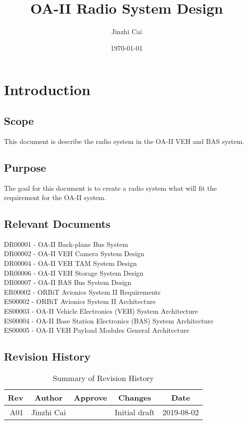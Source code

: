 \documentclass[12pt,article]{memoir}
\title{OA-II Radio System Design}
\author{Jinzhi Cai}
\date{\today}
\begin{document}
	


\tableofcontents*
\clearpage


\chapter{Introduction}
\section{Scope}
This document is describe the radio system in the OA-II VEH and BAS system.
\section{Purpose}
The goal for this document is to create a radio system what will fit the requirement for the OA-II system.
\section{Relevant Documents}
DR00001 - OA-II Back-plane Bus System\\
DR00002 - OA-II VEH Camera System Design\\
DR00004 - OA-II VEH TAM System Design\\
DR00006 - OA-II VEH Storage System Design\\
DR00007 - OA-II BAS Bus System Design\\
ER00002 - ORBiT Avionics System II Requirements\\
ES00002 - ORBiT Avionics System II Architecture\\
ES00003 - OA-II Vehicle Electronics (VEH) System Architecture\\
ES00004 - OA-II Base Station Electronics (BAS) System Architecture\\
ES00005 - OA-II VEH Payload Modules General Architecture
\section{Revision History}
\begin{table}[H]
	\centering
	\begin{tabu}{r || c | c | c | c }
		Rev & Author & Approve & Changes & Date\\ \hline
		A01 & Jinzhi Cai & & Initial draft & 2019-08-02 \\
	\end{tabu}
	\caption{Summary of Revision History}
	\label{tab:rev}
\end{table}
\newpage
\end{document}
